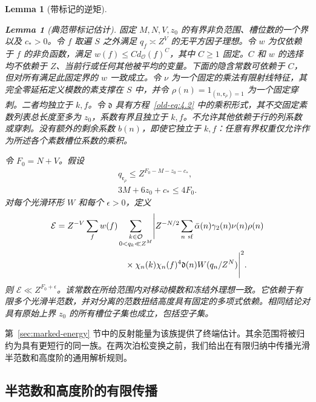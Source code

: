 \documentclass[11pt,a4paper]{article}
\numberwithin{equation}{section}
\numberwithin{figure}{section}
\newtheorem{lemma}[theorem]{Lemma}
\theoremstyle{definition}
\theoremstyle{remark}
\begin{document}
\begin{lemma}[带标记的逆矩]
\begin{lemma}[典范带标记估计]\label{lem:canonical-moment}
固定 \(M,N,V,z_0\) 的有界非负范围、槽位数的一个界以及 \(c_*>0\)。令 \(f\) 取遍 \(S\) 之外满足 \(q_f\asymp Z^V\) 的无平方因子理想。令 \(w\) 为仅依赖于 \(f\) 的非负函数，满足 \(w(f)\le C d_{\mathcal O}(f)^C\)，其中 \(C\ge1\) 固定。\(C\) 和 \(w\) 的选择均不依赖于 \(Z\)、当前行或任何其他被平均的变量。下面的隐含常数可依赖于 \(C\)，但对所有满足此固定界的 \(w\) 一致成立。令 \(\nu\) 为一个固定的乘法有限射线特征，其完全零延拓定义模数的素支撑在 \(S\) 中，并令 \(\rho(n)=1_{(n,\mathfrak r_\rho)=1}\) 为一个固定穿刺。二者均独立于 \(k,f\)。令 \(\mathfrak d\) 具有方程~\eqref{old-eq:4.2} 中的乘积形式，其不交固定素数列表总长度至多为 \(z_0\)，系数有界且独立于 \(k,f\)。不允许其他依赖于行的列系数或穿刺。没有额外的剩余系数 \(b(n)\)，即使它独立于 \(k,f\)：任意有界权重仅允许作为所述各个素数槽位系数的乘积。
\end{lemma}令 \(F_0=N+V\)。假设
\begin{equation}\label{eq:invariant}
 \begin{gathered}
 q_{\mathfrak r_\rho}\le Z^{F_0-M-z_0-c_*},\\
 3M+6z_0+c_*\le4F_0.
 \end{gathered}
\end{equation}
对每个光滑环形 \(W\) 和每个 \(\epsilon>0\)，定义
\begin{equation}\label{eq:canonical-energy}
 \begin{split}
 \mathcal E={}&Z^{-V}\sum_f w(f)
 \sum_{\substack{k\in\mathcal O\\0<q_k\ll Z^M}}
 \Biggl|Z^{-N/2}\sum_{n\ {\rm sf}}
 \bar\alpha(n)\gamma_2(n)\nu(n)\rho(n)\\
 &\hspace{24mm}\times
 \chi_n(k)\chi_n(f)^4\mathfrak d(n)W(q_n/Z^N)\Biggr|^2.
 \end{split}
\end{equation}
则 \(\mathcal E\ll Z^{F_0+\epsilon}\)。该常数在所给范围内对移动模数和冻结外理想一致。它依赖于有限多个光滑半范数，并对分离的范数扭结高度具有固定的多项式依赖。相同结论对具有原始上界 \(z_0\) 的所有槽位子集也成立，包括空子集。
\end{lemma}

第~\ref{sec:marked-energy} 节中的反射能量为该族提供了终端估计。其余范围将被归约为具有更短行的同一族。在两次泊松变换之前，我们给出在有限归纳中传播光滑半范数和高度阶的通用解析规则。

\subsection{半范数和高度阶的有限传播}\label{sec:moment-propagation}
\end{document}
